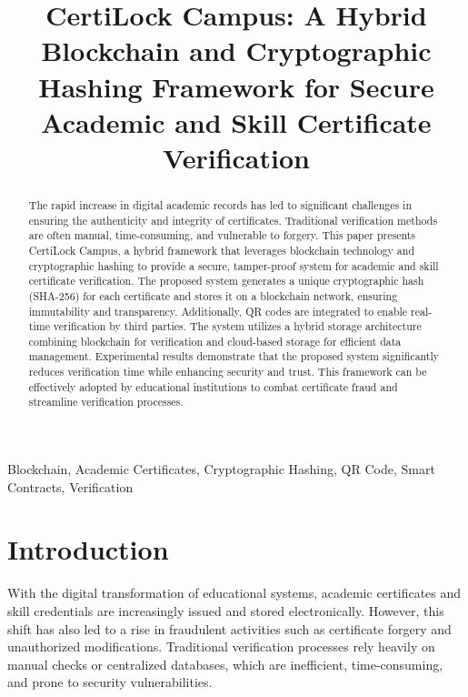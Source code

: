 \documentclass[conference]{IEEEtran}
\begin{document}
\title{CertiLock Campus: A Hybrid Blockchain and Cryptographic Hashing Framework for Secure Academic and Skill Certificate Verification}

\author{
}

\maketitle

\begin{abstract}
The rapid increase in digital academic records has led to significant challenges in ensuring the authenticity and integrity of certificates. Traditional verification methods are often manual, time-consuming, and vulnerable to forgery. This paper presents CertiLock Campus, a hybrid framework that leverages blockchain technology and cryptographic hashing to provide a secure, tamper-proof system for academic and skill certificate verification. The proposed system generates a unique cryptographic hash (SHA-256) for each certificate and stores it on a blockchain network, ensuring immutability and transparency. Additionally, QR codes are integrated to enable real-time verification by third parties. The system utilizes a hybrid storage architecture combining blockchain for verification and cloud-based storage for efficient data management. Experimental results demonstrate that the proposed system significantly reduces verification time while enhancing security and trust. This framework can be effectively adopted by educational institutions to combat certificate fraud and streamline verification processes.
\end{abstract}

\begin{IEEEkeywords}
Blockchain, Academic Certificates, Cryptographic Hashing, QR Code, Smart Contracts, Verification
\end{IEEEkeywords}

\section{Introduction}

With the digital transformation of educational systems, academic certificates and skill credentials are increasingly issued and stored electronically. However, this shift has also led to a rise in fraudulent activities such as certificate forgery and unauthorized modifications. Traditional verification processes rely heavily on manual checks or centralized databases, which are inefficient, time-consuming, and prone to security vulnerabilities.
\end{document}
